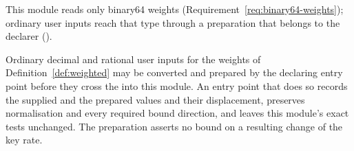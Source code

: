 
This module reads only binary64 weights
(Requirement~\ref{req:binary64-weights}); ordinary user inputs reach that
type through a preparation that belongs to the declarer
().

\begin{requirement}\label{req:weight-preparation}
Ordinary decimal and rational user inputs for the weights of
Definition~\ref{def:weighted} may be converted and prepared by the declaring
entry point before they cross the  into this module. An
entry point that does so records the supplied and the prepared values and
their displacement,
preserves normalisation and every required bound direction, and leaves this
module's exact tests unchanged. The preparation asserts no bound on a
resulting change of the key rate.
\end{requirement}
